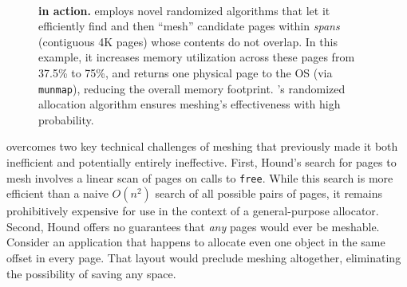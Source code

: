 \begin{figure}[t!]
  \centering
  ~~~~~
  \centering

  \caption{\textbf{\Mesh{} in action.} \Mesh{} employs novel
    randomized algorithms that let it efficiently find and then
    ``mesh'' candidate pages within \emph{spans} (contiguous 4K pages)
    whose contents do not overlap.  In this example, it increases
    memory utilization across these pages from 37.5\% to 75\%, and
    returns one physical page to the OS (via \texttt{munmap}),
    reducing the overall memory footprint. \Mesh{}'s randomized
    allocation algorithm ensures meshing's effectiveness with high
    probability.}

  \label{fig:meshing}
\end{figure}

\Mesh{} overcomes two key technical challenges of meshing that previously made
it both inefficient and potentially entirely ineffective. First,
Hound's search for pages to mesh involves a linear scan of pages on
calls to \texttt{free}. While this search is more efficient than a
naive $O(n^2)$ search of all possible pairs of pages, it remains
prohibitively expensive for use in the context of a general-purpose
allocator. Second, Hound offers no guarantees that \emph{any} pages
would ever be meshable.  Consider an application that happens to
allocate even one object in the same offset in every page. That layout
would preclude meshing altogether, eliminating the possibility of
saving any space.

